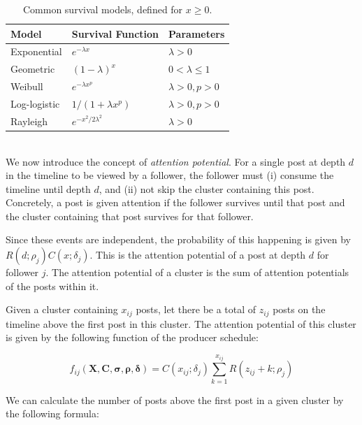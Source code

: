 \documentclass[onesided,asymmetric]{tufte-book}
\begin{document}
\begin{table}
  \centering
  \selectfont
  \begin{tabular}{lll}
    \toprule
    \textbf{Model} & \textbf{Survival Function} & \textbf{Parameters} \\
    \midrule
    Exponential   & $e^{-\lambda x}$             & $\lambda>0$\\
    Geometric     & $(1 - \lambda)^{x}$          & $0<\lambda \leq 1$\\
    Weibull       & $e^{-\lambda x^p}$           & $\lambda>0, p>0$\\
    Log-logistic  & $1 / (1 + \lambda x^p)$      & $\lambda>0, p>0$\\
    Rayleigh      & $e^{-x^2/2\lambda^2}$        & $\lambda>0$\\
    \bottomrule
  \end{tabular}
  \caption[Common survival models.]{Common survival models, defined for $x \geq 0$.}
  \label{table:survival-functions}
\end{table}
\\[2.5pc]

We now introduce the concept of \textit{attention potential}. For a single post at depth $d$ in the timeline to be viewed by a follower, the follower must (i) consume the timeline until depth $d$, and (ii) not skip the cluster containing this post. Concretely, a post is given attention if the follower survives until that post and the cluster containing that post survives for that follower.

Since these events are independent, the probability of this happening is given by $R(d;\rho_j)C(x;\delta_j)$. This is the attention potential of a post at depth $d$ for follower $j$. The attention potential of a cluster is the sum of attention potentials of the posts within it.

Given a cluster containing $x_{ij}$ posts, let there be a total of $z_{ij}$ posts on the timeline above the first post in this cluster. The attention potential of this cluster is given by the following function of the producer schedule:

\begin{equation}
  f_{ij}(\mathbf{X}, \mathbf{C}, \boldsymbol\sigma, \boldsymbol\rho, \boldsymbol\delta) = C(x_{ij};\delta_j)\sum_{k=1}^{x_{ij}}R(z_{ij} + k;\rho_j)
  \label{eq:slot-value}
\end{equation}

We can calculate the number of posts above the first post in a given cluster by the following formula:
\end{document}
